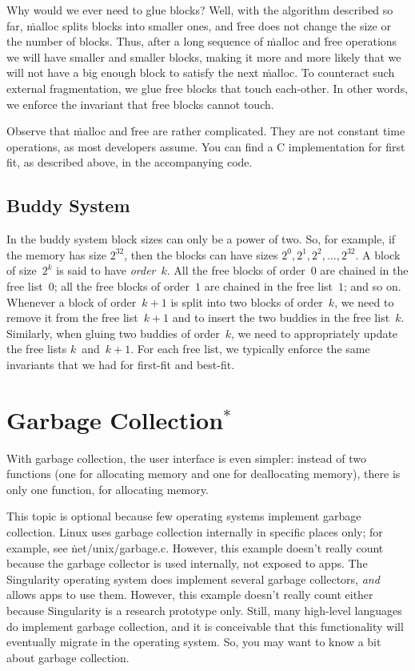 Why would we ever need to glue blocks?
Well, with the algorithm described so far,
  \.{malloc} splits blocks into smaller ones,
  and \.{free} does not change the size or the number of blocks.
Thus, after a long sequence of \.{malloc} and \.{free} operations
  we will have smaller and smaller blocks,
  making it more and more likely
    that we will not have a big enough block to satisfy the next \.{malloc}.
To counteract such external fragmentation,
  we glue free blocks that touch each-other.
In other words, we enforce the invariant that free blocks cannot touch.

\smallskip
Observe that \.{malloc} and \.{free} are rather complicated.
They are not constant time operations, as most developers assume.
You can find a C implementation for first fit, as described above,
  in the accompanying code.

\subsection*{Buddy System}

In the buddy system block sizes can only be a power of two.
So, for example, if the memory has size $2^{32}$,
  then the blocks can have sizes $2^0, 2^1, 2^2, \dots, 2^{32}$.
A block of size~$2^k$ is said to have \emph{order}~$k$.
All the free blocks of order~$0$ are chained in the free list~$0$;
  all the free blocks of order~$1$ are chained in the free list~$1$;
  and so on.
Whenever a block of order~$k+1$ is split into two blocks of order~$k$,
  we need to remove it from the free list~$k+1$
  and to insert the two buddies in the free list~$k$.
Similarly, when gluing two buddies of order~$k$,
  we need to appropriately update the free lists $k$~and~$k+1$.
For each free list,
  we typically enforce the same invariants that we had for first-fit and best-fit.

\section*{Garbage Collection${}^\ast$}

With garbage collection,
  the user interface is even simpler:
  instead of two functions
    (one for allocating memory and one for deallocating memory),
  there is only one function, for allocating memory.

This topic is optional
  because few operating systems implement garbage collection.
Linux uses garbage collection internally in specific places only;
  for example, see \.{net/unix/garbage.c}.
However, this example doesn't really count
  because the garbage collector is used internally, not exposed to apps.
The Singularity operating system does implement several garbage collectors,
  \emph{and} allows apps to use them.
However, this example doesn't really count either
  because Singularity is a research prototype only.
Still,
  many high-level languages do implement garbage collection,
  and it is conceivable that this functionality
    will eventually migrate in the operating system.
So, you may want to know a bit about garbage collection.

